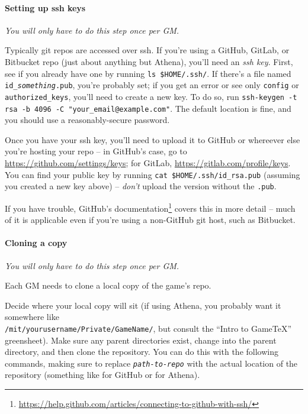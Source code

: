 \documentclass[green]{testgame}
\begin{document}
\paragraph*{Setting up ssh keys} \emph{You will only have to do this step once per GM.}

Typically git repos are accessed over ssh. If you're using a GitHub, GitLab, or Bitbucket repo (just about anything but Athena), you'll need an \emph{ssh key}. First, see if you already have one by running \texttt{ls \$HOME/.ssh/}. If there's a file named \texttt{id\_\emph{something}.pub}, you're probably set; if you get an error or see only \texttt{config} or \texttt{authorized\_keys}, you'll need to create a new key. To do so, run \texttt{ssh-keygen -t rsa -b 4096 -C "your\_email@example.com"}. The default location is fine, and you should use a reasonably-secure password.

Once you have your ssh key, you'll need to upload it to GitHub or whereever else you're hosting your repo -- in GitHub's case, go to \url{https://github.com/settings/keys}; for GitLab, \url{https://gitlab.com/profile/keys}. You can find your public key by running \texttt{cat \$HOME/.ssh/id\_rsa.pub} (assuming you created a new key above) -- \emph{don't} upload the version without the \texttt{.pub}.

If you have trouble, GitHub's documentation\footnote{\url{https://help.github.com/articles/connecting-to-github-with-ssh/}} covers this in more detail -- much of it is applicable even if you're using a non-GitHub git host, such as Bitbucket.

\paragraph*{Cloning a copy} \emph{You will only have to do this step once per GM.}

Each GM needs to clone a local copy of the game's repo.

Decide where your local copy will sit (if using Athena, you probably want it
somewhere like\\ {\tt /mit/yourusername/Private/GameName/}, but consult the
``Intro to GameTeX'' greensheet). Make sure any parent directories exist,
change into the parent directory, and then clone the repository. You can do
this with the following commands, making sure to replace
\texttt{\emph{path-to-repo}} with the actual location of the repository
(something like  for GitHub or
 for Athena).
\end{document}
